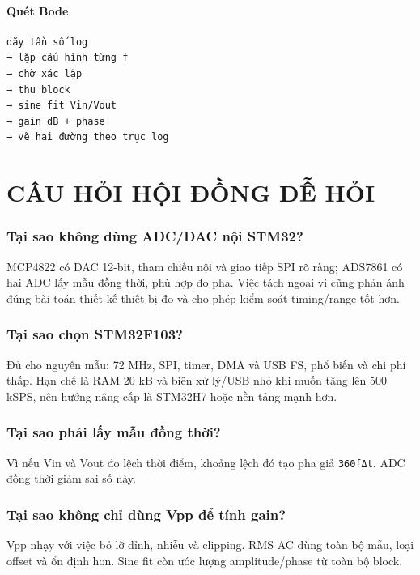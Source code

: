 \documentclass[12pt,a4paper,oneside]{article}
\newcommand{\inlinecode}[1]{\texttt{#1}}
\begin{document}
\subsection{Quét Bode}

\begin{Verbatim}[breaklines=true,breakanywhere=true,fontsize=\small]
dãy tần số log
→ lặp cấu hình từng f
→ chờ xác lập
→ thu block
→ sine fit Vin/Vout
→ gain dB + phase
→ vẽ hai đường theo trục log
\end{Verbatim}

\clearpage

\clearpage
\part{CÂU HỎI HỘI ĐỒNG DỄ HỎI}
\setcounter{section}{0}

\section{Tại sao không dùng ADC/DAC nội STM32?}

MCP4822 có DAC 12-bit, tham chiếu nội và giao tiếp SPI rõ ràng; ADS7861 có hai ADC lấy mẫu đồng thời, phù hợp đo pha. Việc tách ngoại vi cũng phản ánh đúng bài toán thiết kế thiết bị đo và cho phép kiểm soát timing/range tốt hơn.

\section{Tại sao chọn STM32F103?}

Đủ cho nguyên mẫu: 72 MHz, SPI, timer, DMA và USB FS, phổ biến và chi phí thấp. Hạn chế là RAM 20 kB và biên xử lý/USB nhỏ khi muốn tăng lên 500 kSPS, nên hướng nâng cấp là STM32H7 hoặc nền tảng mạnh hơn.

\section{Tại sao phải lấy mẫu đồng thời?}

Vì nếu Vin và Vout đo lệch thời điểm, khoảng lệch đó tạo pha giả \inlinecode{360fΔt}. ADC đồng thời giảm sai số này.

\section{Tại sao không chỉ dùng Vpp để tính gain?}

Vpp nhạy với việc bỏ lỡ đỉnh, nhiễu và clipping. RMS AC dùng toàn bộ mẫu, loại offset và ổn định hơn. Sine fit còn ước lượng amplitude/phase từ toàn bộ block.
\end{document}
